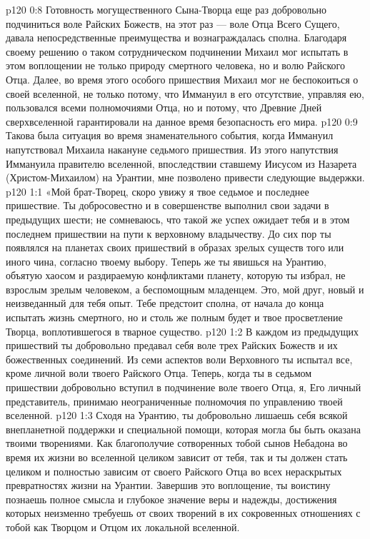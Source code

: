\vs p120 0:8 \pc Готовность могущественного Сына\hyp{}Творца еще раз добровольно подчиниться воле Райских Божеств, на этот раз --- воле Отца Всего Сущего, давала непосредственные преимущества и вознаграждалась сполна. Благодаря своему решению о таком сотрудническом подчинении Михаил мог испытать в этом воплощении не только природу смертного человека, но и волю Райского Отца. Далее, во время этого особого пришествия Михаил мог не беспокоиться о своей вселенной, не только потому, что Иммануил в его отсутствие, управляя ею, пользовался всеми полномочиями Отца, но и потому, что Древние Дней сверхвселенной гарантировали на данное время безопасность его мира.
\vs p120 0:9 \pc Такова была ситуация во время знаменательного события, когда Иммануил напутствовал Михаила накануне седьмого пришествия. Из этого напутствия Иммануила правителю вселенной, впоследствии ставшему Иисусом из Назарета (Христом\hyp{}Михаилом) на Урантии, мне позволено привести следующие выдержки.
\vs p120 1:1 «Мой брат\hyp{}Творец, скоро увижу я твое седьмое и последнее пришествие. Ты добросовестно и в совершенстве выполнил свои задачи в предыдущих шести; не сомневаюсь, что такой же успех ожидает тебя и в этом последнем пришествии на пути к верховному владычеству. До сих пор ты появлялся на планетах своих пришествий в образах зрелых существ того или иного чина, согласно твоему выбору. Теперь же ты явишься на Урантию, объятую хаосом и раздираемую конфликтами планету, которую ты избрал, не взрослым зрелым человеком, а беспомощным младенцем. Это, мой друг, новый и неизведанный для тебя опыт. Тебе предстоит сполна, от начала до конца испытать жизнь смертного, но и столь же полным будет и твое просветление Творца, воплотившегося в тварное существо.
\vs p120 1:2 В каждом из предыдущих пришествий ты добровольно предавал себя воле трех Райских Божеств и их божественных соединений. Из семи аспектов воли Верховного ты испытал все, кроме личной воли твоего Райского Отца. Теперь, когда ты в седьмом пришествии добровольно вступил в подчинение воле твоего Отца, я, Его личный представитель, принимаю неограниченные полномочия по управлению твоей вселенной.
\vs p120 1:3 Сходя на Урантию, ты добровольно лишаешь себя всякой внепланетной поддержки и специальной помощи, которая могла бы быть оказана твоими творениями. Как благополучие сотворенных тобой сынов Небадона во время их жизни во вселенной целиком зависит от тебя, так и ты должен стать целиком и полностью зависим от своего Райского Отца во всех нераскрытых превратностях жизни на Урантии. Завершив это воплощение, ты воистину познаешь полное смысла и глубокое значение веры и надежды, достижения которых неизменно требуешь от своих творений в их сокровенных отношениях с тобой как Творцом и Отцом их локальной вселенной.
